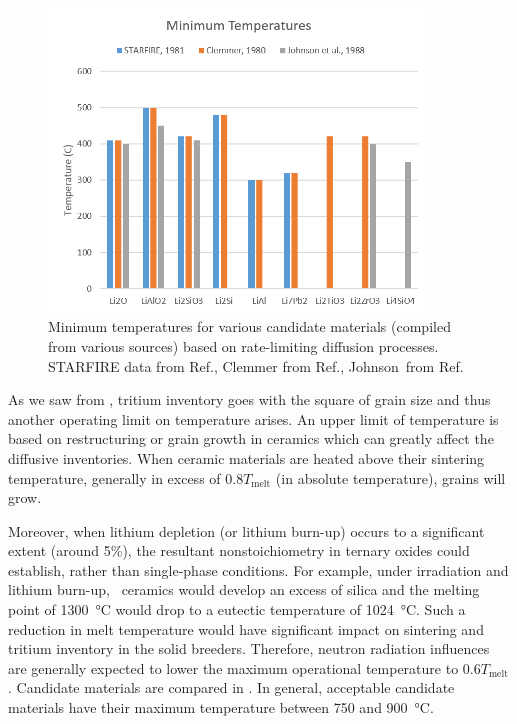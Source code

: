 \begin{figure}[ht]
	\centering
	\includegraphics[width=0.9\textwidth]{figures/Tmin} 
	\caption{Minimum temperatures for various candidate materials (compiled from various sources) based on rate-limiting diffusion processes. STARFIRE data from Ref.\cite{Johnson1981}, Clemmer from Ref.\cite{Clemmer1980}, Johnson\etal~from Ref.\cite{Johnson1988}}
	\label{fig:Tmin}
\end{figure}

As we saw from , tritium inventory goes with the square of grain size and thus another operating limit on temperature arises. An upper limit of temperature is based on restructuring or grain growth in ceramics which can greatly affect the diffusive inventories. When ceramic materials are heated above their sintering temperature, generally in excess of $0.8 T_\text{melt}$ (in absolute temperature), grains will grow. 

Moreover, when lithium depletion (or lithium burn-up) occurs to a significant extent (around 5\%), the resultant nonstoichiometry in ternary oxides could establish, rather than single-phase conditions. For example, under irradiation and lithium burn-up, \lis~ceramics would develop an excess of silica and the melting point of \SI{1300}{\celsius} would drop to a eutectic temperature of \SI{1024}{\celsius}. Such a reduction in melt temperature would have significant impact on sintering and tritium inventory in the solid breeders.\cite{Johnson1981} Therefore, neutron radiation influences are generally expected to lower the maximum operational temperature to $0.6 T_\text{melt}$.\cite{Johnson1981} Candidate materials are compared in . In general, acceptable candidate materials have their maximum temperature between 750 and \SI{900}{\celsius}. 

